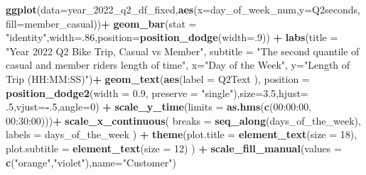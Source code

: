 \documentclass[
]{article}
\newenvironment{Shaded}{\begin{snugshade}}{\end{snugshade}}
\newcommand{\AttributeTok}[1]{\textcolor[rgb]{0.13,0.29,0.53}{#1}}
\newcommand{\DecValTok}[1]{\textcolor[rgb]{0.00,0.00,0.81}{#1}}
\newcommand{\FloatTok}[1]{\textcolor[rgb]{0.00,0.00,0.81}{#1}}
\newcommand{\FunctionTok}[1]{\textcolor[rgb]{0.13,0.29,0.53}{\textbf{#1}}}
\newcommand{\NormalTok}[1]{#1}
\newcommand{\SpecialCharTok}[1]{\textcolor[rgb]{0.81,0.36,0.00}{\textbf{#1}}}
\newcommand{\StringTok}[1]{\textcolor[rgb]{0.31,0.60,0.02}{#1}}
\begin{document}
\begin{Shaded}
\begin{Highlighting}[]
\FunctionTok{ggplot}\NormalTok{(}\AttributeTok{data=}\NormalTok{year\_2022\_q2\_df\_fixed,}\FunctionTok{aes}\NormalTok{(}\AttributeTok{x=}\NormalTok{day\_of\_week\_num,}\AttributeTok{y=}\NormalTok{Q2seconds, }\AttributeTok{fill=}\NormalTok{member\_casual))}\SpecialCharTok{+}
  \FunctionTok{geom\_bar}\NormalTok{(}\AttributeTok{stat =} \StringTok{"identity"}\NormalTok{,}\AttributeTok{width=}\NormalTok{.}\DecValTok{86}\NormalTok{,}\AttributeTok{position=}\FunctionTok{position\_dodge}\NormalTok{(}\AttributeTok{width=}\NormalTok{.}\DecValTok{9}\NormalTok{)) }\SpecialCharTok{+}
  \FunctionTok{labs}\NormalTok{(}\AttributeTok{title =} \StringTok{"Year 2022 Q2 Bike Trip, Casual vs Member"}\NormalTok{,}
       \AttributeTok{subtitle =} \StringTok{"The second quantile of casual and member rider\textquotesingle{}s length of time"}\NormalTok{,}
       \AttributeTok{x=}\StringTok{"Day of the Week"}\NormalTok{,}
       \AttributeTok{y=}\StringTok{"Length of Trip (HH:MM:SS)"}\NormalTok{)}\SpecialCharTok{+}
  \FunctionTok{geom\_text}\NormalTok{(}\FunctionTok{aes}\NormalTok{(}\AttributeTok{label =}\NormalTok{ Q2Text ),}
            \AttributeTok{position =} \FunctionTok{position\_dodge2}\NormalTok{(}\AttributeTok{width =} \FloatTok{0.9}\NormalTok{, }\AttributeTok{preserve =} \StringTok{"single"}\NormalTok{),}\AttributeTok{size=}\FloatTok{3.5}\NormalTok{,}\AttributeTok{hjust=}\NormalTok{ .}\DecValTok{5}\NormalTok{,}\AttributeTok{vjust=}\SpecialCharTok{{-}}\NormalTok{.}\DecValTok{5}\NormalTok{,}\AttributeTok{angle=}\DecValTok{0}\NormalTok{) }\SpecialCharTok{+}
  \FunctionTok{scale\_y\_time}\NormalTok{(}\AttributeTok{limits =} \FunctionTok{as.hms}\NormalTok{(}\FunctionTok{c}\NormalTok{(}\StringTok{\textquotesingle{}00:00:00\textquotesingle{}}\NormalTok{, }\StringTok{\textquotesingle{}00:30:00\textquotesingle{}}\NormalTok{)))}\SpecialCharTok{+}
  \FunctionTok{scale\_x\_continuous}\NormalTok{(}
    \AttributeTok{breaks =} \FunctionTok{seq\_along}\NormalTok{(days\_of\_the\_week), }
    \AttributeTok{labels =}\NormalTok{ days\_of\_the\_week}
\NormalTok{  )  }\SpecialCharTok{+}
  \FunctionTok{theme}\NormalTok{(}\AttributeTok{plot.title =} \FunctionTok{element\_text}\NormalTok{(}\AttributeTok{size =} \DecValTok{18}\NormalTok{),}
        \AttributeTok{plot.subtitle =} \FunctionTok{element\_text}\NormalTok{(}\AttributeTok{size =} \DecValTok{12}\NormalTok{)}
\NormalTok{  ) }\SpecialCharTok{+}
  \FunctionTok{scale\_fill\_manual}\NormalTok{(}\AttributeTok{values =} \FunctionTok{c}\NormalTok{(}\StringTok{"orange"}\NormalTok{,}\StringTok{"violet"}\NormalTok{),}\AttributeTok{name=}\StringTok{"Customer"}\NormalTok{)}
\end{Highlighting}
\end{Shaded}
\end{document}
